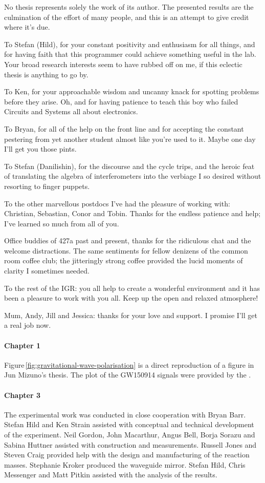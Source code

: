 No thesis represents solely the work of its author. The presented results are the culmination of the effort of many people, and this is an attempt to give credit where it's due.

\bigskip

To Stefan (Hild), for your constant positivity and enthusiasm for all things, and for having faith that this programmer could achieve something useful in the lab. Your broad research interests seem to have rubbed off on me, if this eclectic thesis is anything to go by.

To Ken, for your approachable wisdom and uncanny knack for spotting problems before they arise. Oh, and for having patience to teach this boy who failed Circuits and Systems all about electronics.

To Bryan, for all of the help on the front line and for accepting the constant pestering from yet another student almost like you're used to it. Maybe one day I'll get you those pints.

To Stefan (Danilishin), for the discourse and the cycle trips, and the heroic feat of translating the algebra of interferometers into the verbiage I so desired without resorting to finger puppets.

To the other marvellous postdocs I've had the pleasure of working with: Christian, Sebastian, Conor and Tobin. Thanks for the endless patience and help; I've learned so much from all of you.

Office buddies of 427a past and present, thanks for the ridiculous chat and the welcome distractions. The same sentiments for fellow denizens of the common room coffee club; the jitteringly strong coffee provided the lucid moments of clarity I sometimes needed.

To the rest of the IGR: you all help to create a wonderful environment and it has been a pleasure to work with you all. Keep up the open and relaxed atmosphere!

Mum, Andy, Jill and Jessica: thanks for your love and support. I promise I'll get a real job now.

\paragraph{Chapter 1}
Figure\,\ref{fig:gravitational-wave-polarisation} is a direct reproduction of a figure in Jun Mizuno's thesis. The plot of the GW150914 signals were provided by the \LSC{}.

\paragraph{Chapter 3}
The experimental work was conducted in close cooperation with Bryan Barr. Stefan Hild and Ken Strain assisted with conceptual and technical development of the experiment. Neil Gordon, John Macarthur, Angus Bell, Borja Sorazu and Sabina Huttner assisted with construction and measurements. Russell Jones and Steven Craig provided help with the design and manufacturing of the reaction masses. Stephanie Kroker produced the waveguide mirror. Stefan Hild, Chris Messenger and Matt Pitkin assisted with the analysis of the results.

